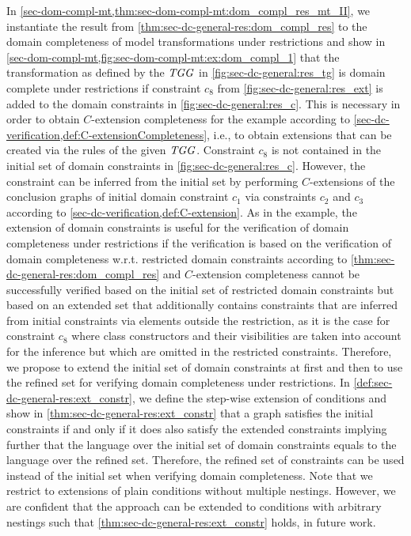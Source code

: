 In \cref{sec-dom-compl-mt,thm:sec-dom-compl-mt:dom_compl_res_mt_II}, we instantiate the result from \cref{thm:sec-dc-general-res:dom_compl_res} to the domain completeness of model transformations under restrictions and show in \cref{sec-dom-compl-mt,fig:sec-dom-compl-mt:ex:dom_compl_1} that the transformation as defined by the $\mathit{TGG}$ in \cref{fig:sec-dc-general:res_tg} is domain complete under restrictions if constraint $c_8$ from \cref{fig:sec-dc-general:res_ext} is added to the domain constraints in \cref{fig:sec-dc-general:res_c}.
This is necessary in order to obtain $C$-extension completeness for the example according to \cref{sec-dc-verification,def:C-extensionCompleteness}, i.e., to obtain extensions that can be created via the rules of the given $\mathit{TGG}$.
Constraint $c_8$ is not contained in the initial set of domain constraints in \cref{fig:sec-dc-general:res_c}.
However, the constraint can be inferred from the initial set by performing $C$-extensions of the conclusion graphs of initial domain constraint $c_1$ via constraints $c_2$ and $c_3$ according to \cref{sec-dc-verification,def:C-extension}.
As in the example, the extension of domain constraints is useful for the verification of domain completeness under restrictions if the verification is based on the verification of domain completeness w.r.t. restricted domain constraints according to \cref{thm:sec-dc-general-res:dom_compl_res} and $C$-extension completeness cannot be successfully verified based on the initial set of restricted domain constraints but based on an extended set that additionally contains constraints that are inferred from initial constraints via elements outside the restriction, as it is the case for constraint $c_8$ where class constructors and their visibilities are taken into account for the inference but which are omitted in the restricted constraints.
Therefore, we propose to extend the initial set of domain constraints at first and then to use the refined set for verifying domain completeness under restrictions.
In \cref{def:sec-dc-general-res:ext_constr}, we define the step-wise extension of conditions and show in \cref{thm:sec-dc-general-res:ext_constr} that a graph satisfies the initial constraints if and only if it does also satisfy the extended constraints implying further that the language over the initial set of domain constraints equals to the language over the refined set.
Therefore, the refined set of constraints can be used instead of the initial set when verifying domain completeness.
Note that we restrict to extensions of plain conditions without multiple nestings.
However, we are confident that the approach can be extended to conditions with arbitrary nestings such that \cref{thm:sec-dc-general-res:ext_constr} holds, in future work.

